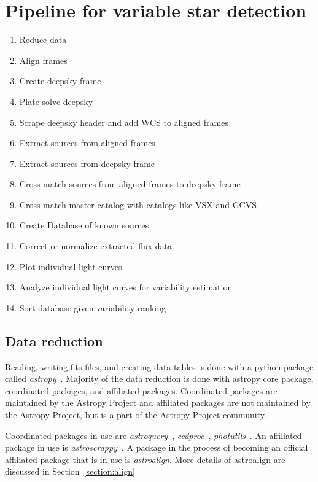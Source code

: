 \section{Pipeline for variable star detection}
\begin{enumerate}
    \item Reduce data
    \item Align frames
    \item Create deepsky frame
    \item Plate solve deepsky
    \item Scrape deepsky header and add WCS to aligned frames
    \item Extract sources from aligned frames
    \item Extract sources from deepsky frame
    \item Cross match sources from aligned frames to deepsky frame
    \item Cross match master catalog with catalogs like VSX and GCVS
    \item Create Database of known sources
    \item Correct or normalize extracted flux data
    \item Plot individual light curves
    \item Analyze individual light curves for variability estimation
    \item Sort database given variability ranking
\end{enumerate}

\subsection{Data reduction}
Reading, writing fits files, and creating data tables is done with a python
package called \textit{astropy}~\cite{astropy_2013,astropy_2018}.
Majority of the data reduction is done with astropy core package,
coordinated packages, and affiliated packages.
Coordinated packages are maintained by the Astropy Project
and affiliated packages are not maintained by the Astropy Project,
but is a part of the Astropy Project community.

Coordinated packages in use are \textit{astroquery}~\cite{astroquery}, \textit{ccdproc}~\cite{ccdproc}, \textit{photutils}~\cite{photutils}.
An affiliated package in use is \textit{astroscrappy}~\cite{astroscrappy}.
A package in the process of becoming an official affiliated package that is in use is \textit{astroalign}. 
More details of astroalign are discussed in Section~\ref{section:align} 

